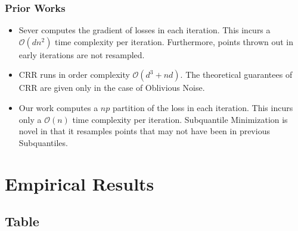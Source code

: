 \documentclass[
11pt, %
serif
]{beamer}
\begin{document}
	\begin{frame}
		\frametitle{Prior Works }
		\begin{itemize}
			\item[\ding{228}]
			\cite{DiakonikolasKKLSS19} Sever computes the gradient of losses in each iteration. This incurs a $\mathcal{O}(dn^2)$ time complexity per iteration. Furthermore, points thrown out in early iterations are not resampled. 
			\item[\ding{228}]
			\cite{bhatia2017} CRR runs in order complexity $\mathcal{O}(d^3 + nd)$. The theoretical guarantees of CRR are given only in the case of Oblivious Noise.
			\item[\ding{228}] 
			Our work computes a $np$ partition of the loss in each iteration. This incurs only a $\mathcal{O}(n)$ time complexity per iteration. Subquantile Minimization is novel in that it resamples points that may not have been in previous Subquantiles.
		\end{itemize}
		
	\end{frame}
	
	
	
	\section{Empirical Results}
	
	\subsection{Table}
	
\end{document}
